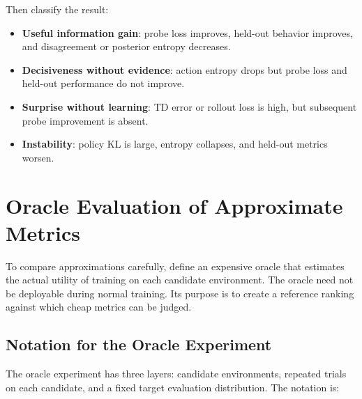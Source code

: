 \documentclass[11pt]{article}
\begin{document}
Then classify the result:
\begin{itemize}[leftmargin=*]
  \item \textbf{Useful information gain}: probe loss improves, held-out behavior
  improves, and disagreement or posterior entropy decreases.
  \item \textbf{Decisiveness without evidence}: action entropy drops but probe
  loss and held-out performance do not improve.
  \item \textbf{Surprise without learning}: TD error or rollout loss is high,
  but subsequent probe improvement is absent.
  \item \textbf{Instability}: policy KL is large, entropy collapses, and held-out
  metrics worsen.
\end{itemize}

\section{Oracle Evaluation of Approximate Metrics}

To compare approximations carefully, define an expensive oracle that estimates
the actual utility of training on each candidate environment. The oracle need
not be deployable during normal training. Its purpose is to create a reference
ranking against which cheap metrics can be judged.

\subsection{Notation for the Oracle Experiment}

The oracle experiment has three layers: candidate environments, repeated trials
on each candidate, and a fixed target evaluation distribution. The notation is:
\end{document}
